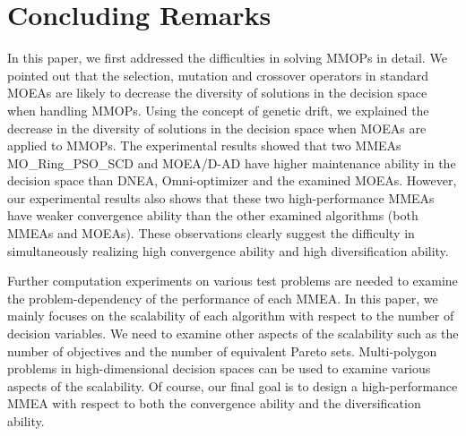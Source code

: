 \documentclass[conference]{IEEEtran}
\begin{document}
\section{Concluding Remarks}
\label{Conclusion}
In this paper, we first addressed the difficulties in solving MMOPs in detail. We pointed out that the selection, mutation and crossover operators in standard MOEAs are likely to decrease the diversity of solutions in the decision space when handling MMOPs. Using the concept of genetic drift, we explained the decrease in the diversity of solutions in the decision space when MOEAs are applied to MMOPs. The experimental results showed that two MMEAs MO\_Ring\_PSO\_SCD and MOEA/D-AD have higher maintenance ability in the decision space than DNEA, Omni-optimizer and the examined MOEAs. However, our experimental results also shows that these two high-performance MMEAs have weaker convergence ability than the other examined algorithms (both MMEAs and MOEAs). These observations clearly suggest the difficulty in simultaneously realizing high convergence ability and high diversification ability.

Further computation experiments on various test problems are needed to examine the problem-dependency of the performance of each MMEA. In this paper, we mainly focuses on the scalability of each algorithm with respect to the number of decision variables. We need to examine other aspects of the scalability such as the number of objectives and the number of equivalent Pareto sets. Multi-polygon problems in high-dimensional decision spaces can be used to examine various aspects of the scalability. Of course, our final goal is to design a high-performance MMEA with respect to both the convergence ability and the diversification ability.


\end{document}
